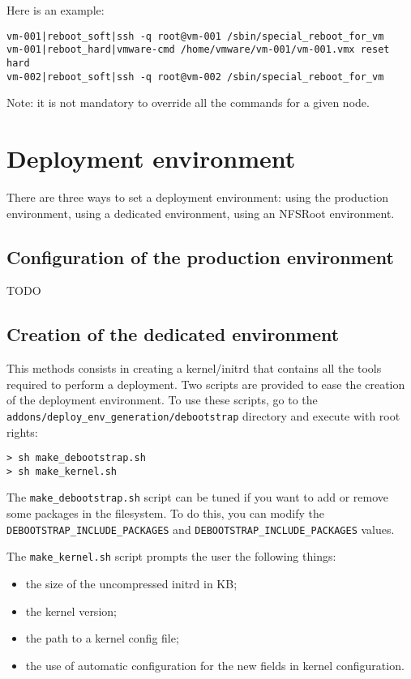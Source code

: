 \documentclass[a4wide,10pt,oneside]{book}
\begin{document}
Here is an example:
\begin{small}
\begin{verbatim}
vm-001|reboot_soft|ssh -q root@vm-001 /sbin/special_reboot_for_vm
vm-001|reboot_hard|vmware-cmd /home/vmware/vm-001/vm-001.vmx reset hard
vm-002|reboot_soft|ssh -q root@vm-002 /sbin/special_reboot_for_vm
\end{verbatim}
\end{small}
Note: it is not mandatory to override all the commands for a given node.


\section{Deployment environment}
There are three ways to set a deployment environment: using the production environment, using a dedicated environment, using an NFSRoot environment.

\subsection{Configuration of the production environment}
TODO
\subsection{Creation of the dedicated environment}
This methods consists in creating a kernel/initrd that contains all the tools required to perform a deployment. Two scripts are provided to ease the creation of the deployment environment. To use these scripts, go to the \texttt{addons/deploy\_env\_generation/debootstrap} directory and execute with root rights:
\begin{small}
\begin{verbatim}
> sh make_debootstrap.sh
> sh make_kernel.sh
\end{verbatim}
\end{small}

The \texttt{make\_debootstrap.sh} script can be tuned if you want to add or remove some packages in the filesystem. To do this, you can modify the \texttt{DEBOOTSTRAP\_INCLUDE\_PACKAGES} and \texttt{DEBOOTSTRAP\_INCLUDE\_PACKAGES} values.

The \texttt{make\_kernel.sh} script prompts the user the following things:
\begin{itemize}
\item the size of the uncompressed initrd in KB;
\item the kernel version;
\item the path to a kernel config file;
\item the use of automatic configuration for the new fields in kernel configuration.
\end{itemize}
\end{document}
